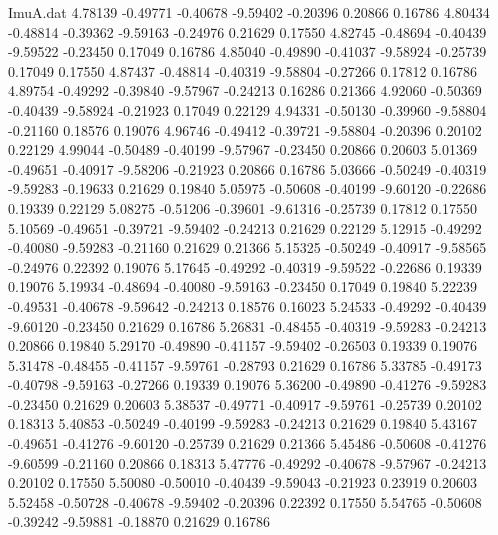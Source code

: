 \begin{filecontents}{ImuA.dat}
   4.78139   -0.49771   -0.40678   -9.59402   -0.20396    0.20866    0.16786
   4.80434   -0.48814   -0.39362   -9.59163   -0.24976    0.21629    0.17550
   4.82745   -0.48694   -0.40439   -9.59522   -0.23450    0.17049    0.16786
   4.85040   -0.49890   -0.41037   -9.58924   -0.25739    0.17049    0.17550
   4.87437   -0.48814   -0.40319   -9.58804   -0.27266    0.17812    0.16786
   4.89754   -0.49292   -0.39840   -9.57967   -0.24213    0.16286    0.21366
   4.92060   -0.50369   -0.40439   -9.58924   -0.21923    0.17049    0.22129
   4.94331   -0.50130   -0.39960   -9.58804   -0.21160    0.18576    0.19076
   4.96746   -0.49412   -0.39721   -9.58804   -0.20396    0.20102    0.22129
   4.99044   -0.50489   -0.40199   -9.57967   -0.23450    0.20866    0.20603
   5.01369   -0.49651   -0.40917   -9.58206   -0.21923    0.20866    0.16786
   5.03666   -0.50249   -0.40319   -9.59283   -0.19633    0.21629    0.19840
   5.05975   -0.50608   -0.40199   -9.60120   -0.22686    0.19339    0.22129
   5.08275   -0.51206   -0.39601   -9.61316   -0.25739    0.17812    0.17550
   5.10569   -0.49651   -0.39721   -9.59402   -0.24213    0.21629    0.22129
   5.12915   -0.49292   -0.40080   -9.59283   -0.21160    0.21629    0.21366
   5.15325   -0.50249   -0.40917   -9.58565   -0.24976    0.22392    0.19076
   5.17645   -0.49292   -0.40319   -9.59522   -0.22686    0.19339    0.19076
   5.19934   -0.48694   -0.40080   -9.59163   -0.23450    0.17049    0.19840
   5.22239   -0.49531   -0.40678   -9.59642   -0.24213    0.18576    0.16023
   5.24533   -0.49292   -0.40439   -9.60120   -0.23450    0.21629    0.16786
   5.26831   -0.48455   -0.40319   -9.59283   -0.24213    0.20866    0.19840
   5.29170   -0.49890   -0.41157   -9.59402   -0.26503    0.19339    0.19076
   5.31478   -0.48455   -0.41157   -9.59761   -0.28793    0.21629    0.16786
   5.33785   -0.49173   -0.40798   -9.59163   -0.27266    0.19339    0.19076
   5.36200   -0.49890   -0.41276   -9.59283   -0.23450    0.21629    0.20603
   5.38537   -0.49771   -0.40917   -9.59761   -0.25739    0.20102    0.18313
   5.40853   -0.50249   -0.40199   -9.59283   -0.24213    0.21629    0.19840
   5.43167   -0.49651   -0.41276   -9.60120   -0.25739    0.21629    0.21366
   5.45486   -0.50608   -0.41276   -9.60599   -0.21160    0.20866    0.18313
   5.47776   -0.49292   -0.40678   -9.57967   -0.24213    0.20102    0.17550
   5.50080   -0.50010   -0.40439   -9.59043   -0.21923    0.23919    0.20603
   5.52458   -0.50728   -0.40678   -9.59402   -0.20396    0.22392    0.17550
   5.54765   -0.50608   -0.39242   -9.59881   -0.18870    0.21629    0.16786

\end{filecontents}
